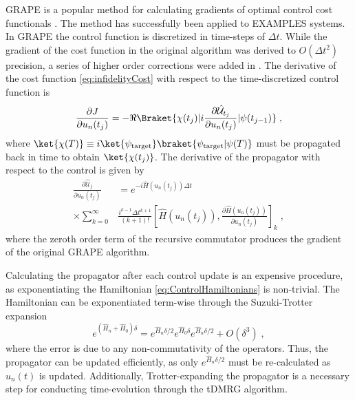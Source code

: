 GRAPE is a popular method for calculating gradients of optimal control cost functionals \cite{khaneja2005optimal}. The method has successfully been applied to EXAMPLES systems. In GRAPE the control function is discretized in time-steps of  $\Delta t$. While the gradient of the cost function in the original algorithm was derived to $O(\Delta t ^2)$ precision, a series of higher order corrections were added in \cite{de2011second}. The derivative of the cost function \eqref{eq:infidelityCost} with respect to the time-discretized control function is
\begin{equation}
	\frac{\partial J}{\partial u_n (t_j)}  = - \Re \Braket{\chi (t_j) | i  \frac{\partial \hat{\mathcal{U}}_{t_j}}{\partial u_n (t_j)} | \psi (t_{j-1})} \; , \label{eq:CostDeriv}
\end{equation}
where $\ket{\chi (T)} \equiv i \ket{\psi_{\mathrm{target}}} \braket{\psi_{\mathrm{target}} | \psi (T)}$ must be propagated back in time to obtain $\ket{\chi (t_j)}$.
The derivative of the propagator with respect to the control is given by
\begin{align}
	\frac{\partial \hat{\mathcal{U}}_{j}}{\partial u_n (t_j)} &= e^{-i \hat{H} (u_n (t_j)) \Delta t} \nonumber \\ 
	 \times \sum_{k = 0}^{\infty } &  \frac{i^{k-1} \Delta t^{k+1}}{(k+1)!} \left[ \hat{H} (u_n (t_j)) , \frac{\partial \hat{H} (u_n (t_j))}{\partial u_n (t_j)}  \right]_k \; , \label{eq:PropDeriv}
\end{align}
where the zeroth order term of the recursive commutator produces the gradient of the original GRAPE algorithm.

Calculating the propagator after each control update is an expensive procedure, as exponentiating the Hamiltonian \eqref{eq:ControlHamiltonians} is non-trivial. The Hamiltonian can be exponentiated term-wise through the Suzuki-Trotter expansion
\begin{equation}
		e ^{( \hat{H}_n + \hat{H}_0  ) \delta } = e^{  \hat{H}_n \delta /2  } e^{ \hat{H}_0 \delta } e^{ \hat{H}_n \delta /2 } + O(\delta^3) \; , \label{eq:SuzukiTrotter}
\end{equation}
where the error is due to any non-commutativity of the operators.
Thus, the propagator can be updated efficiently, as only $e^{ \hat{H}_n \delta /2 }$ must be re-calculated as $u_n (t)$ is updated. Additionally, Trotter-expanding the propagator is a necessary step for conducting time-evolution through the tDMRG algorithm. 

